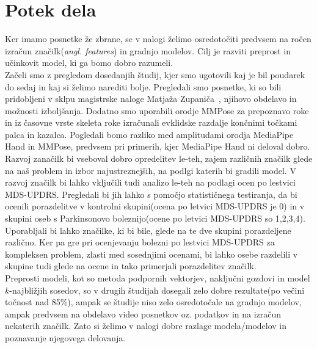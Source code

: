\documentclass[a4paper,12pt]{article}  %
\begin{document}
\section{Potek dela}
Ker imamo posnetke že zbrane, se v nalogi želimo osredotočiti predvsem na ročen izračun značilk(\textit{angl. features}) 
in gradnjo modelov. Cilj je razviti preprost in učinkovit model, ki ga bomo dobro razumeli. \\

Začeli smo z pregledom dosedanjih študij, kjer smo ugotovili kaj je bil poudarek do sedaj in kaj si želimo 
narediti bolje. Pregledali smo posnetke, ki so bili pridobljeni v sklpu magistrske naloge Matjaža 
Zupaniča~\cite{Zupanic}, njihovo obdelavo in možnosti izboljšanja. Dodatno smo uporabili orodje 
MMPose za prepoznavo roke in iz časovne vrste skeleta roke izračunali evklidske razdalje končnimi 
točkami palca in kazalca. Pogledali bomo razliko med amplitudami orodja MediaPipe Hand in MMPose, 
predvsem pri primerih, kjer MediaPipe Hand ni deloval dobro. \\

Razvoj zanačilk bi vseboval dobro opredelitev le-teh, zajem različnih značilk glede na naš problem in 
izbor najustreznejših, na podlgi katerih bi gradili model. V razvoj značilk bi lahko vključili tudi analizo 
le-teh na podlagi ocen po lestvici MDS-UPDRS. Pregledali bi jih lahko s pomočjo statističnega testiranja, 
da bi ocenili porazdelitve v kontrolni skupini(ocena po letvici MDS-UPDRS je 0) in v skupini oseb s 
Parkinsonovo boleznijo(ocene po letvici MDS-UPDRS so 1,2,3,4). Uporabljali bi lahko značilke, ki bi bile, 
glede na te dve skupini porazdeljene različno. Ker pa gre pri ocenjevanju bolezni po lestvici MDS-UPDRS za 
kompleksen problem, zlasti med sosednjimi ocenami, bi lahko osebe razdelili v skupine tudi glede na ocene in 
tako primerjali porazdelitev značilk. \\

Preprosti modeli, kot so metoda podpornih vektorjev, naključni gozdovi in model $k$-najbližjih sosedov, so 
v drugih študijah dosegali zelo dobre rezultate(po večini točnost nad 85\%), ampak se študije niso zelo 
osredotočale na gradnjo modelov, ampak predvsem na obdelavo video posnetkov oz. podatkov in na izračun 
nekaterih značilk. Zato si želimo v nalogi dobre razlage modela/modelov in poznavanje njegovega delovanja.

\newpage
\printbibliography
\end{document}
